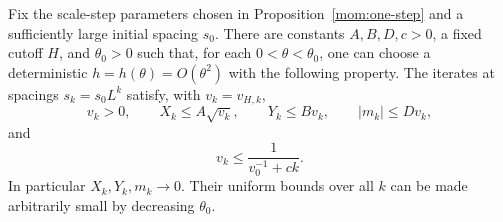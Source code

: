 \begin{theorem}
\label{traj:critical-trajectory}
Fix the scale-step parameters chosen in Proposition~\ref{mom:one-step}
and a sufficiently large initial spacing
$s_0$.  There are constants $A,B,D,c>0$, a fixed cutoff $H$, and
$\theta_0>0$ such that, for each $0<\theta<\theta_0$, one can choose
a deterministic $h=h(\theta)=O(\theta^2)$ with the following property.
The iterates
at spacings $s_k=s_0L^k$ satisfy, with $v_k=v_{H,k}$,
\begin{equation}
 v_k>0,\qquad
 X_k\le A\sqrt{v_k},\qquad
 Y_k\le Bv_k,\qquad
 |m_k|\le Dv_k,
 \label{traj:invariant-bounds}
\end{equation}
and
\begin{equation}
 v_k\le\frac{1}{v_0^{-1}+ck}.
 \label{traj:variance-decay}
\end{equation}
In particular $X_k,Y_k,m_k\to0$.  Their uniform bounds over all
$k$ can be made arbitrarily small by decreasing $\theta_0$.
\end{theorem}

